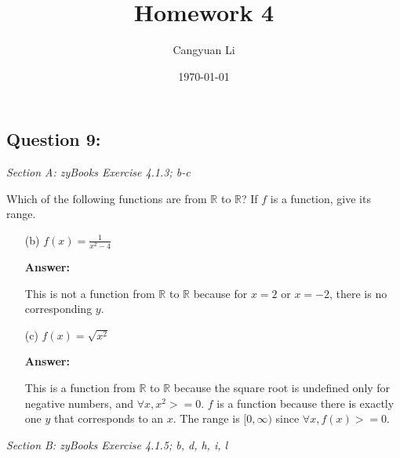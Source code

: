 \documentclass[14pt]{extreport}
\title{Homework 4}
\author{Cangyuan Li}
\date{\today}
\newcommand{\ddfrac}[2]{\frac{\displaystyle #1}{\displaystyle #2}}
\newcommand{\answer}[0]{\medskip \textbf{Answer:} \medskip}
\newcommand{\R}[0]{\mathbb{R}}
\begin{document}
\maketitle

\subsection*{Question 9:}

\textit{Section A: zyBooks Exercise 4.1.3; b-c}

\bigskip

Which of the following functions are from \( \mathbb{R} \) to \( \mathbb{R} \)? If \( f \) is a function, give its range.

\begin{enumerate}
    \item[(b)] \( f(x) = \ddfrac{1}{x^2 - 4} \)
    
        \answer

        This is not a function from \( \R \) to \( \R \) because for \( x = 2 \) or \( x = -2 \), there is no corresponding \( y \).
    
    \item[(c)] \( f(x) = \sqrt{x^2} \)
    
        \answer

        This is a function from \( \R \) to \( \R \) because the square root is undefined only for negative numbers, and \( \forall x, x^2 >= 0 \). \( f \) is a function because there is exactly one \( y \) that corresponds to an \( x \). The range is \( [0, \infty) \) since \( \forall x, f(x) >= 0 \).

\end{enumerate}

\textit{Section B: zyBooks Exercise 4.1.5; b, d, h, i, l}
\end{document}
